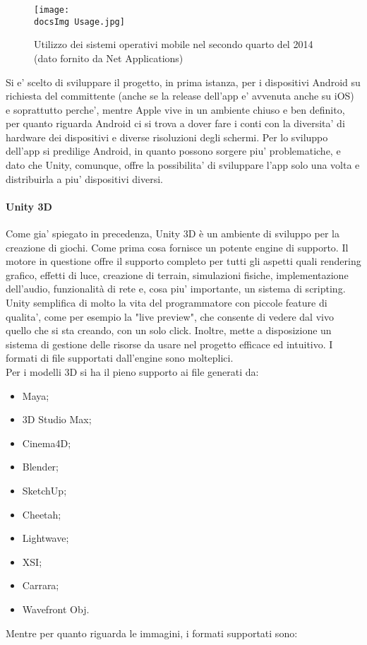 \begin{figure}[H]
	\centering
	\texttt{[image: \\docsImg Usage.jpg]}
	\caption{Utilizzo dei sistemi operativi mobile nel secondo quarto del 2014 (dato fornito da Net Applications)}
	\label{fig:Utilizzo dei sistemi operativi mobile nel secondo quarto del 2014}
\end{figure}

Si e' scelto di sviluppare il progetto, in prima istanza, per i dispositivi Android su richiesta del committente (anche se la release dell'app e' avvenuta anche su iOS) e soprattutto perche', mentre Apple vive in un ambiente chiuso e ben definito, per quanto riguarda Android ci si trova a dover fare i conti con la diversita' di hardware dei dispositivi e diverse risoluzioni degli schermi. Per lo sviluppo dell'app si predilige Android, in quanto possono sorgere piu' problematiche, e dato che Unity, comunque, offre la possibilita' di sviluppare l'app solo una volta e distribuirla a piu' dispositivi diversi.


\paragraph{Unity 3D}
Come gia' spiegato in precedenza, Unity 3D è un ambiente di sviluppo per la creazione di giochi. Come prima cosa fornisce un potente engine di supporto. Il motore in questione offre il supporto completo per tutti gli aspetti quali rendering grafico, effetti di luce, creazione di terrain, simulazioni fisiche, implementazione dell’audio, funzionalità di rete e, cosa piu' importante, un sistema di scripting.
Unity semplifica di molto la vita del programmatore con piccole feature di qualita', come per esempio la "live preview", che consente di vedere dal vivo quello che si sta creando, con un solo click. Inoltre, mette a disposizione un sistema di gestione delle risorse da usare nel progetto efficace ed intuitivo.
I formati di file supportati dall'engine sono molteplici. 
\\Per i modelli 3D si ha il pieno supporto ai file generati da:

\begin{multicols}{3}
\begin{itemize}
	\item Maya;
	\item 3D Studio Max;
	\item Cinema4D;
	\item Blender;
	\item SketchUp;
	\item Cheetah;
	\item Lightwave;
	\item XSI;
	\item Carrara;
	\item Wavefront Obj.
\end{itemize}
\end{multicols}
Mentre per quanto riguarda le immagini, i formati supportati sono:

